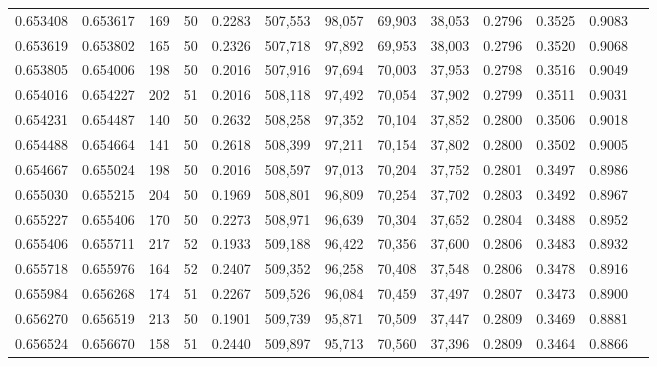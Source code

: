 \begin{tabular}{rrrrrrrrrrrrr}
0.653408 & 0.653617 &   169 &  50 &                                     0.2283 & 507,553 &  98,057 &  69,903 &  38,053 & 0.2796 & 0.3525 & 0.9083 \\
0.653619 & 0.653802 &   165 &  50 &                                     0.2326 & 507,718 &  97,892 &  69,953 &  38,003 & 0.2796 & 0.3520 & 0.9068 \\
0.653805 & 0.654006 &   198 &  50 &                                     0.2016 & 507,916 &  97,694 &  70,003 &  37,953 & 0.2798 & 0.3516 & 0.9049 \\
0.654016 & 0.654227 &   202 &  51 &                                     0.2016 & 508,118 &  97,492 &  70,054 &  37,902 & 0.2799 & 0.3511 & 0.9031 \\
0.654231 & 0.654487 &   140 &  50 &                                     0.2632 & 508,258 &  97,352 &  70,104 &  37,852 & 0.2800 & 0.3506 & 0.9018 \\
0.654488 & 0.654664 &   141 &  50 &                                     0.2618 & 508,399 &  97,211 &  70,154 &  37,802 & 0.2800 & 0.3502 & 0.9005 \\
0.654667 & 0.655024 &   198 &  50 &                                     0.2016 & 508,597 &  97,013 &  70,204 &  37,752 & 0.2801 & 0.3497 & 0.8986 \\
0.655030 & 0.655215 &   204 &  50 &                                     0.1969 & 508,801 &  96,809 &  70,254 &  37,702 & 0.2803 & 0.3492 & 0.8967 \\
0.655227 & 0.655406 &   170 &  50 &                                     0.2273 & 508,971 &  96,639 &  70,304 &  37,652 & 0.2804 & 0.3488 & 0.8952 \\
0.655406 & 0.655711 &   217 &  52 &                                     0.1933 & 509,188 &  96,422 &  70,356 &  37,600 & 0.2806 & 0.3483 & 0.8932 \\
0.655718 & 0.655976 &   164 &  52 &                                     0.2407 & 509,352 &  96,258 &  70,408 &  37,548 & 0.2806 & 0.3478 & 0.8916 \\
0.655984 & 0.656268 &   174 &  51 &                                     0.2267 & 509,526 &  96,084 &  70,459 &  37,497 & 0.2807 & 0.3473 & 0.8900 \\
0.656270 & 0.656519 &   213 &  50 &                                     0.1901 & 509,739 &  95,871 &  70,509 &  37,447 & 0.2809 & 0.3469 & 0.8881 \\
0.656524 & 0.656670 &   158 &  51 &                                     0.2440 & 509,897 &  95,713 &  70,560 &  37,396 & 0.2809 & 0.3464 & 0.8866 \\

\end{tabular}
